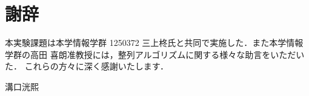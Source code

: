 \chapter*{謝辞}
本実験課題は本学情報学群 1250372 三上柊氏と共同で実施した．また本学情報学群の高田 喜朗准教授には，整列アルゴリズムに関する様々な助言をいただいた．
これらの方々に深く感謝いたします．
\begin{flushright}
   溝口洸熙
\end{flushright}
